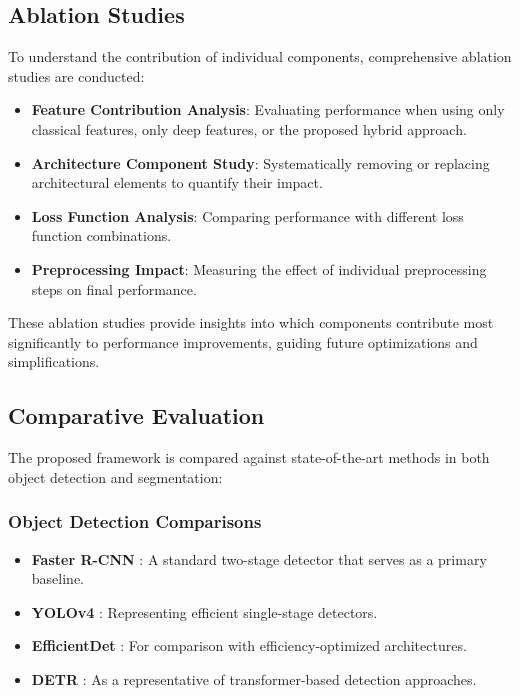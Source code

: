 \subsection{Ablation Studies}
To understand the contribution of individual components, comprehensive ablation studies are conducted:

\begin{itemize}
    \item \textbf{Feature Contribution Analysis}: Evaluating performance when using only classical features, only deep features, or the proposed hybrid approach.
    
    \item \textbf{Architecture Component Study}: Systematically removing or replacing architectural elements to quantify their impact.
    
    \item \textbf{Loss Function Analysis}: Comparing performance with different loss function combinations.
    
    \item \textbf{Preprocessing Impact}: Measuring the effect of individual preprocessing steps on final performance.
\end{itemize}

These ablation studies provide insights into which components contribute most significantly to performance improvements, guiding future optimizations and simplifications.

\subsection{Comparative Evaluation}
The proposed framework is compared against state-of-the-art methods in both object detection and segmentation:

\subsubsection{Object Detection Comparisons}
\begin{itemize}
    \item \textbf{Faster R-CNN} \cite{ren2015faster}: A standard two-stage detector that serves as a primary baseline.
    
    \item \textbf{YOLOv4} \cite{bochkovskiy2020yolov4}: Representing efficient single-stage detectors.
    
    \item \textbf{EfficientDet} \cite{tan2020efficientdet}: For comparison with efficiency-optimized architectures.
    
    \item \textbf{DETR} \cite{carion2020end}: As a representative of transformer-based detection approaches.
\end{itemize}

